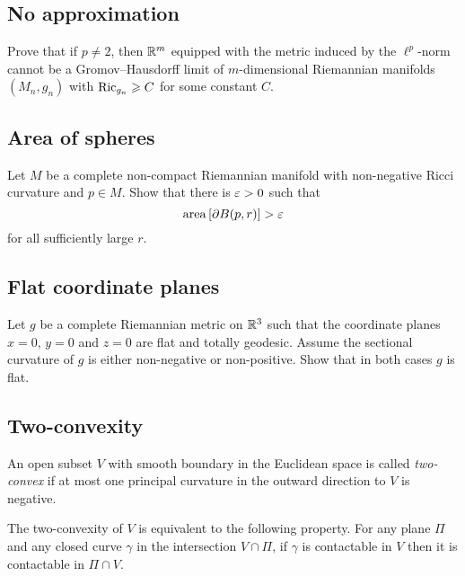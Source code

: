 \subsection*{No approximation\many}
\label{No approximation}

\begin{pr}
Prove that 
if $p\not=2$,
then $\mathbb{R}^m$ 
equipped with the metric induced by the $\ell^p$-norm 
cannot be a
Gromov--Hausdorff limit of
$m$-dimensional Riemannian manifolds $(M_n,g_n)$ with $\Ric_{g_n}\z\ge C$ for some constant $C$.
\end{pr}

\subsection*{Area of spheres}
\label{Area of spheres}

\begin{pr}
Let $M$ be a complete non-compact Riemannian manifold 
with non-negative Ricci curvature and $p\in M$.
Show that there is $\varepsilon>0$ such that 
$$\operatorname{\rm area}\nolimits\left[\partial B(p,r)\right]>\varepsilon$$
for all sufficiently large $r$.
\end{pr}

\subsection*{Flat coordinate planes}
\label{Flat coordinate planes}

\begin{pr}
Let $g$ be a complete Riemannian metric on $\mathbb{R}^3$ such that the coordinate planes $x=0$, $y=0$ and $z=0$ are flat and totally geodesic.
Assume the sectional curvature of $g$ is either non-negative or non-positive.
Show that in both cases $g$ is flat. 
\end{pr}

\subsection*{Two-convexity\many}
\label{Two-convexity}

An open subset $V$ with smooth boundary in the Euclidean space  
is called \emph{two-convex} if at most one principal curvature in the outward direction to $V$ is negative.

The two-convexity of $V$ is equivalent to the following property.
For any plane $\Pi$ and any closed curve $\gamma$ in the intersection  $V\cap \Pi$,
if $\gamma$ is contactable in $V$ then it is contactable in $\Pi\cap V$.

